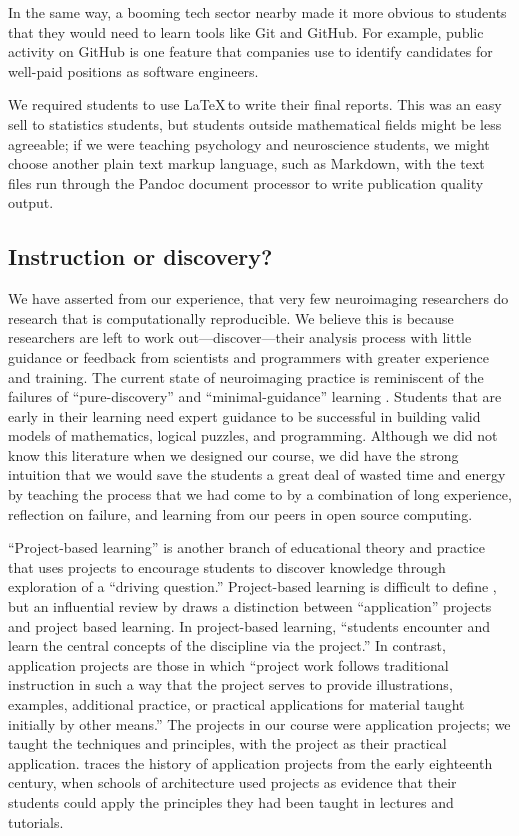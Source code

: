 In the same way, a booming tech sector nearby made it more obvious to students
that they would need to learn tools like Git and GitHub.
For example, public activity on GitHub is one
feature that companies use to identify candidates for well-paid positions as
software engineers.

We required students to use \LaTeX\,to write their final reports.  This was an
easy sell to statistics students, but students outside mathematical fields
might be less agreeable; if we were teaching psychology and neuroscience
students, we might choose another plain text markup language, such as
Markdown, with the text files run through the Pandoc document processor to
write publication quality output.

\subsection{Instruction or discovery?}

We have asserted from our experience, that very few neuroimaging researchers
do research that is computationally reproducible.  We believe this is because
researchers are left to work out---discover---their analysis process with
little guidance or feedback from scientists and programmers with greater
experience and training.  The current state of neuroimaging practice is
reminiscent of the failures of ``pure-discovery'' and ``minimal-guidance''
learning \citep{mayer2004strikes, kirschner2006minimal}.  Students that are
early in their learning need expert guidance to be successful in building
valid models of mathematics, logical puzzles, and programming.  Although we
did not know this literature when we designed our course, we did have the
strong intuition that we would save the students a great deal of wasted time
and energy by teaching the process that we had come to by a combination of
long experience, reflection on failure, and learning from our peers in open
source computing.

``Project-based learning'' is another branch of educational theory and
practice that uses projects to encourage students to discover knowledge
through exploration of a ``driving question.''  Project-based learning is
difficult to define \citep{condliffe2017project}, but an influential review by
\citet{thomas2000review} draws a distinction between ``application'' projects
and project based learning.  In project-based learning, ``students encounter
and learn the central concepts of the discipline via the project.''  In
contrast, application projects are those in which ``project work follows
traditional instruction in such a way that the project serves to provide
illustrations, examples, additional practice, or practical applications for
material taught initially by other means.''  The projects in our course were
application projects; we taught the techniques and principles, with the
project as their practical application. \citet{knoll2012mistake} traces the
history of application projects from the early eighteenth century, when
schools of architecture used projects as evidence that their students could
apply the principles they had been taught in lectures and tutorials.

